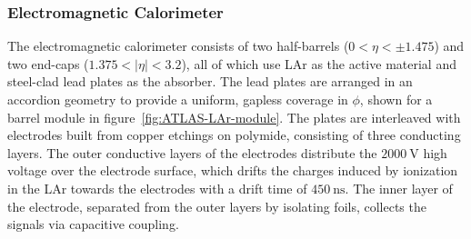 \subsubsection{Electromagnetic Calorimeter}\label{sec:ATLAS-calorimeters-ecal}

The electromagnetic calorimeter consists of two half-barrels ($0<\eta<\pm1.475$) and two end-caps ($1.375<|\eta|<3.2$), all of which use LAr as the active material and steel-clad lead plates as the absorber. The lead plates are arranged in an accordion geometry to provide a uniform, gapless coverage in $\phi$, shown for a barrel module in figure~\ref{fig:ATLAS-LAr-module}. The plates are interleaved with electrodes built from copper etchings on polymide, consisting of three conducting layers. The outer conductive layers of the electrodes distribute the $\SI{2000}{\volt}$ high voltage over the electrode surface, which drifts the charges induced by ionization in the LAr towards the electrodes with a drift time of $\SI{450}{\nano\second}$. The inner layer of the electrode, separated from the outer layers by isolating foils, collects the signals via capacitive coupling.

